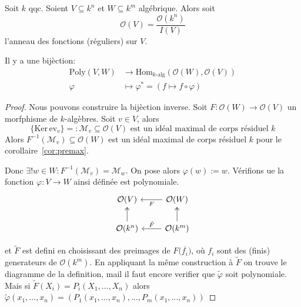 \begin{proposition}{}\label{prop:poly-kalg}
    Soit \(k\) qqc.
    Soient \(V \subseteq k^{n} \) et \(W \subseteq k^{m} \) algébrique.
    Alors soit
    \[
      \mathcal{O}{(V)} = \frac{\mathcal{O}{(k^{n})}}{I{(V)}}
    \]
    l'anneau des fonctions (réguliers) sur \(V\). 

    Il y a une bijèction:
  \begin{align*}
      \mathrm{Poly}{(V, W)} &\longrightarrow
      \mathrm{Hom}_{k\text{-alg}}{(\mathcal{O}{(W)}, \mathcal{O}{(V)})}  \\
       \varphi &\longmapsto \varphi ^{*} = {(f \mapsto f \circ \varphi )}
  \end{align*}
\end{proposition}
\begin{proof}{}
    Nous pouvons construire la bijèction inverse. Soit \(F : \mathcal{O}{(W)}
    \to \mathcal{O}{(V)}\) un morfphisme de \(k\)-algèbres. Soit \(v \in V\),
    alors
    \[
      \{\mathrm{Ker}\,\mathrm{ev}_v\} =: \mathcal{M}_v \subseteq
      \mathcal{O}{(V)} \text{ est un idéal maximal de corps résiduel \(k\)} 
    \]
    Alors \(F^{-1}{(\mathcal{M}_v)} \subseteq \mathcal{O}{(W)} \) est un idéal
    maximal de corps résiduel \(k\) pour le corollaire~\ref{cor:premax}.

    Donc \(\exists ! w \in W : F^{-1}{(\mathcal{M}_v)} = \mathcal{M}_w\). On
    pose alors \(\varphi {(w)} := w\). Vérifions ue la fonction \(\varphi  : V
    \to W\) ainsi définée est polynomiale.
    \[
    \begin{tikzcd}
        \mathcal{O}{(V)} & \mathcal{O}{(W)} \\
        {\mathcal{O}{(k^{n})}} & {\mathcal{O}{(k^m)}}
        \arrow["F", from=1-2, to=1-1]
        \arrow[two heads, from=2-1, to=1-1]
        \arrow["{\tilde{F}}"', from=2-2, to=2-1]
        \arrow[two heads, from=2-2, to=1-2]
    \end{tikzcd}
    \]

    et \(\tilde{F}\) est defini en choisissant des preimages de
    \(F{(\overline{f_{i}}})\), où \(f_{i}\) sont des (finis) generateurs de
    \(\mathcal{O}{(k^{m})}\). En appliquant la même construction à \(\tilde{F}\)
    on trouve le diagramme de la definition, mail il faut encore verifier que
    \(\tilde{\varphi}\) soit polynomiale. Mais si \(\tilde{F}{(X_{i})} =
    P_{i}{(X_{1} , \dots, X_{n})}\) alors \(\tilde{\varphi}{(x_{1}, \dots,
x_{n})} = {(P_{1}{(x_{1}, \dots, x_{n})}, \dots, P_{m}{(x_{1}, \dots, x_{n})})}\) 
\end{proof}


